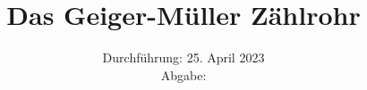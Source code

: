 

\subject{\texorpdfstring{\vspace{2ex}}{}V703\texorpdfstring{\vspace{-2ex}}{}} %
\title{Das Geiger-Müller Zählrohr} %
\date{
	Durchführung: 25. April 2023 %
	\\ Abgabe:%
}




\maketitle
\thispagestyle{empty}


\tableofcontents
\newpage







\printbibliography{}

\newpage



